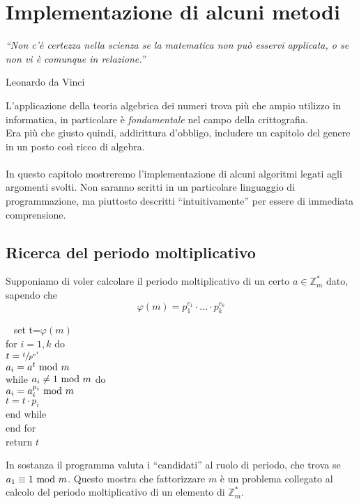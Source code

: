 	



\chapter{Implementazione di alcuni metodi}

	\epigraph{\textit{\enquote{Non c'è certezza nella scienza se la matematica non può esservi applicata, o se non vi è comunque in relazione.}}}{Leonardo da Vinci}
	L'applicazione della teoria algebrica dei numeri trova più che ampio utilizzo in informatica, in particolare è \textit{fondamentale} nel campo della crittografia. \\ Era più che giusto quindi, addirittura d'obbligo, includere un capitolo del genere in un posto così ricco di algebra. \\ \\ In questo capitolo mostreremo l'implementazione di alcuni algoritmi legati agli argomenti svolti. Non saranno scritti in un particolare linguaggio di programmazione, ma piuttosto descritti \enquote{intuitivamente} per essere di immediata comprensione. \newpage
	\section{Ricerca del periodo moltiplicativo}
	Supponiamo di voler calcolare il periodo moltiplicativo di un certo $a\in\mathbb{Z}_m^*$ dato, sapendo che 
	\begin{equation*}
	\varphi(m)=p_1^{e_1}\cdot\dots\cdot p_k^{e_k}
	\end{equation*}
	\begin{algoritmo} \ \newline
			{\selectfont
			\hspace*{10 mm} set t=$\varphi(m)$\\ 
			\hspace*{10 mm} for $i=1,k$ do \\
			\hspace*{15 mm} $t=\sfrac{t}{p^{e^i}}$\\
			\hspace*{15 mm} $a_i=a^t\ \mathrm{mod}\ m$\\
			\hspace*{15 mm} while $a_i\neq1 \ \mathrm{mod}\ m$ do\\
			\hspace*{20 mm} $a_i=a_i^{p_i}\ \mathrm{mod}\ m$\\
			\hspace*{20 mm} $t=t\cdot p_i$\\
			\hspace*{15 mm} end while\\
			\hspace*{10 mm} end for\\
			\hspace*{10 mm} return $t$}
	\end{algoritmo}
	In sostanza il programma valuta i \enquote{candidati} al ruolo di periodo, che trova se $a_1\equiv1\ \mathrm{mod}\ m$. Questo mostra che fattorizzare $m$ è un problema collegato al calcolo del periodo moltiplicativo di un elemento di $\mathbb{Z}_m^*$. 
	
